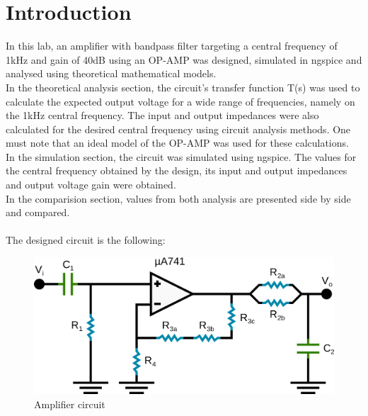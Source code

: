 \section{Introduction}
\label{sec:intro}
In this lab, an amplifier with bandpass filter targeting a central frequency of 1kHz and gain of 40dB using an OP-AMP was designed, simulated in ngspice and analysed using theoretical mathematical models.\\
 In the theoretical analysis section, the circuit's transfer function T(s) was used to calculate the expected output voltage for a wide range of frequencies, namely on the 1kHz central frequency. The input and output impedances were also calculated for the desired central frequency using circuit analysis methods. One must note that an ideal model of the OP-AMP was used for these calculations. \\
 In the simulation section, the circuit was simulated using ngspice. The values for the central frequency obtained by the design, its input and output impedances and output voltage gain were obtained.\\
In the comparision section, values from both analysis are presented side by side and compared.\\ \\
The designed circuit is the following:

\begin{figure} [!htb] 
  \includegraphics[width=\linewidth]{circuit.png}
  \vspace{1cm}
  \caption{Amplifier circuit}
  \label{fig:circuit}
  \hfill
\end{figure}



\FloatBarrier
